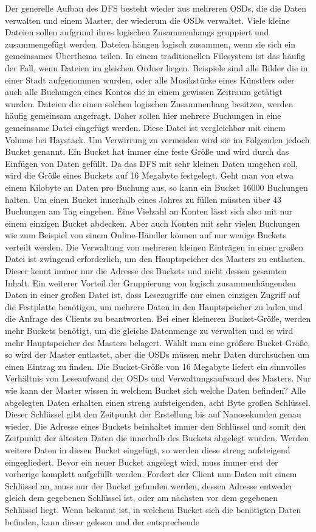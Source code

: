 \documentclass[12pt,oneside,a4paper,parskip]{scrbook}
\begin{document}
Der generelle Aufbau des DFS besteht wieder aus mehreren OSDs, die die Daten verwalten und einem Master, der wiederum die OSDs verwaltet. Viele kleine Dateien sollen aufgrund ihres logischen Zusammenhangs gruppiert und zusammengefügt werden. Dateien hängen logisch zusammen, wenn sie sich ein gemeinsames Überthema teilen. In einem traditionellen Filesystem ist das häufig der Fall, wenn Dateien im gleichen Ordner liegen. Beispiele sind alle Bilder die in einer Stadt aufgenommen wurden, oder alle Musikstücke eines Künstlers oder auch alle Buchungen eines Kontos die in einem gewissen Zeitraum getätigt wurden. Dateien die einen solchen logischen Zusammenhang besitzen, werden häufig gemeinsam angefragt. Daher sollen hier mehrere Buchungen in eine gemeinsame Datei eingefügt werden. Diese Datei ist vergleichbar mit einem Volume bei Haystack. Um Verwirrung zu vermeiden wird sie im Folgenden jedoch Bucket genannt. Ein Bucket hat immer eine feste Größe und wird durch das Einfügen von Daten gefüllt. Da das DFS mit sehr kleinen Daten umgehen soll, wird die Größe eines Buckets auf 16 Megabyte festgelegt. Geht man von etwa einem Kilobyte an Daten pro Buchung aus, so kann ein Bucket 16000 Buchungen halten. Um einen Bucket innerhalb eines Jahres zu füllen müssten über 43 Buchungen am Tag eingehen. Eine Vielzahl an Konten lässt sich also mit nur einem einzigen Bucket abdecken. Aber auch Konten mit sehr vielen Buchungen wie zum Beispiel von einem Online-Händler können auf nur wenige Buckets verteilt werden. Die Verwaltung von mehreren kleinen Einträgen in einer großen Datei ist zwingend erforderlich, um den Hauptspeicher des Masters zu entlasten. Dieser kennt immer nur die Adresse des Buckets und nicht dessen gesamten Inhalt. Ein weiterer Vorteil der Gruppierung von logisch zusammenhängenden Daten in einer großen Datei ist, dass Lesezugriffe nur einen einzigen Zugriff auf die Festplatte benötigen, um mehrere Daten in den Hauptspeicher zu laden und die Anfrage des Clients zu beantworten. Bei einer kleineren Bucket-Größe, werden mehr Buckets benötigt, um die gleiche Datenmenge zu verwalten und es wird mehr Hauptspeicher des Masters belagert. Wählt man eine größere Bucket-Größe, so wird der Master entlastet, aber die OSDs müssen mehr Daten durchsuchen um einen Eintrag zu finden. Die Bucket-Größe von 16 Megabyte liefert ein sinnvolles Verhältnis von Leseaufwand der OSDs und Verwaltungsaufwand des Masters. Nur wie kann der Master wissen in welchem Bucket sich welche Daten befinden? Alle abgelegten Daten erhalten einen streng aufsteigenden, acht Byte großen Schlüssel. Dieser Schlüssel gibt den Zeitpunkt der Erstellung bis auf Nanosekunden genau wieder. Die Adresse eines Buckets beinhaltet immer den Schlüssel und somit den Zeitpunkt der ältesten Daten die innerhalb des Buckets abgelegt wurden. Werden weitere Daten in diesen Bucket eingefügt, so werden diese streng aufsteigend eingegliedert. Bevor ein neuer Bucket angelegt wird, muss immer erst der vorherige komplett aufgefüllt werden. Fordert der Client nun Daten mit einem Schlüssel an, muss nur der Bucket gefunden werden, dessen Adresse entweder gleich dem gegebenen Schlüssel ist, oder am nächsten vor dem gegebenen Schlüssel liegt. Wenn bekannt ist, in welchem Bucket sich die benötigten Daten befinden, kann dieser gelesen und der entsprechende 
\end{document}

